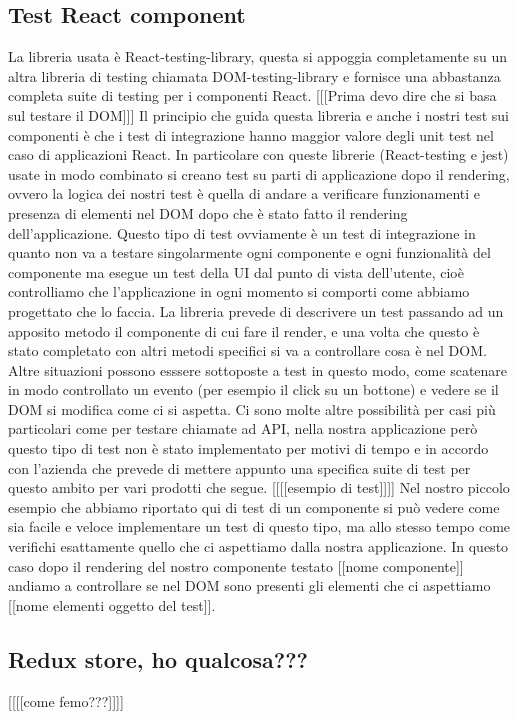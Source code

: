 \subsection{Test React component}
La libreria usata è React-testing-library, questa si appoggia completamente su un altra libreria di testing chiamata DOM-testing-library e fornisce una abbastanza completa suite di testing per i componenti React.
  [[[Prima devo dire che si basa sul testare il DOM]]]
Il principio che guida questa libreria e anche i nostri test sui componenti è che i test di integrazione hanno maggior valore degli unit test nel caso di applicazioni React. In particolare con queste librerie (React-testing e jest) usate in modo combinato
si creano test su parti di applicazione dopo il rendering, ovvero la logica dei nostri test è quella di andare a verificare funzionamenti e presenza di elementi nel DOM dopo che è stato fatto il rendering
dell'applicazione. Questo tipo di test ovviamente è un test di integrazione in quanto non va a testare singolarmente ogni componente e ogni funzionalità del componente ma esegue un test della UI dal punto di vista dell'utente, cioè controlliamo che
l'applicazione in ogni momento si comporti come abbiamo progettato che lo faccia.
La libreria prevede di descrivere un test passando ad un apposito metodo il componente di cui fare il render, e una volta che questo è stato completato con altri metodi specifici si va a controllare cosa è nel DOM. Altre situazioni
possono esssere sottoposte a test in questo modo, come scatenare in modo controllato un evento (per esempio il click su un bottone) e vedere se il DOM si modifica come ci si aspetta. Ci sono molte altre possibilità per
casi più particolari come per testare chiamate ad API, nella nostra applicazione però questo tipo di test non è stato implementato per motivi di tempo e in accordo con l'azienda che prevede di mettere appunto
una specifica suite di test per questo ambito per vari prodotti che segue.
  [[[[esempio di test]]]]
Nel nostro piccolo esempio che abbiamo riportato qui di test di un componente si può vedere come sia facile e veloce implementare un test di questo tipo, ma allo stesso tempo come verifichi esattamente quello
che ci aspettiamo dalla nostra applicazione. In questo caso dopo il rendering del nostro componente testato [[nome componente]] andiamo a controllare se nel DOM sono presenti gli elementi che ci aspettiamo [[nome elementi oggetto del test]].
\subsection{Redux store, ho qualcosa???}
[[[[come femo???]]]]